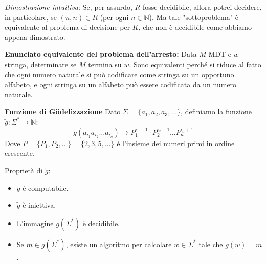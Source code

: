 \textit{Dimostrazione intuitiva:} Se, per assurdo, $R$ fosse decidibile, allora potrei decidere, in particolare, se $(n, n) \in R$ (per ogni $n \in \mathbb{N}$). Ma tale "sottoproblema" è equivalente al problema di decisione per $K$, che non è decidibile come abbiamo appena dimostrato.

\vspace{0.4cm}
\textbf{Enunciato equivalente del problema dell'arresto:}
Data $M$ MDT e $w$ stringa, determinare se $M$ termina su $w$.
Sono equivalenti perché si riduce al fatto che ogni numero naturale si può codificare come stringa su un opportuno alfabeto, e ogni stringa su un alfabeto può essere codificata da un numero naturale.

\vspace{0.8cm}
\textbf{Funzione di Gödelizzazione}
Dato $\Sigma = \{a_1, a_2, a_3, \dots\}$, definiamo la funzione $\ddot{g}: \Sigma^* \to \mathbb{N}$:
$$ \ddot{g}(a_{i_1} a_{i_2} \dots a_{i_n}) \mapsto P_1^{i_1+1} \cdot P_2^{i_2+1} \dots P_n^{i_n+1} $$
Dove $P = \{P_1, P_2, \dots\} = \{2, 3, 5, \dots\}$ è l'insieme dei numeri primi in ordine crescente.

Proprietà di $\ddot{g}$:
\begin{itemize}
    \item $\ddot{g}$ è computabile.
    \item $\ddot{g}$ è iniettiva.
    \item L'immagine $\ddot{g}(\Sigma^*)$ è decidibile.
    \item Se $m \in \ddot{g}(\Sigma^*)$, esiste un algoritmo per calcolare $w \in \Sigma^*$ tale che $\ddot{g}(w) = m$.
\end{itemize}


